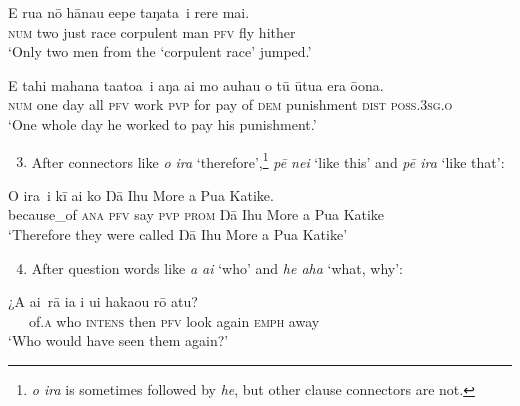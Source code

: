 \ea\label{ex:7.77}
\gll {\ob}E rua nō hānau {\ꞌ}e{\ꞌ}epe taŋata\,{\cb} i rere mai. \\
{\db}\textsc{num} two just race corpulent man \textsc{pfv} fly hither \\

\glt 
‘Only two men from the ‘corpulent race’ jumped.’ \textstyleExampleref{[Mtx-3-02.038]}
\z

\ea\label{ex:7.78}
\gll {\ob}E tahi mahana ta{\ꞌ}ato{\ꞌ}a\,{\cb} i aŋa ai mo {\ꞌ}auhau o tū ūtu{\ꞌ}a  era ō{\ꞌ}ona.\\
{\db}\textsc{num} one day all \textsc{pfv} work \textsc{pvp} for pay of \textsc{dem} punishment  \textsc{dist} \textsc{poss.3sg.o}\\

\glt
‘One whole day he worked to pay his punishment.’ \textstyleExampleref{[R250.026]} 
\z

\begin{enumerate}
\setcounter{enumi}{2} 
\item 
After  connectors like \textit{{\ꞌ}o ira} ‘therefore’,\footnote{\label{fn:339}\textit{{\ꞌ}o ira} is sometimes followed by \textit{he}, but other clause connectors are not.} \textit{pē nei} ‘like this’ and \textit{pē ira} ‘like that’: 

\end{enumerate}

\ea\label{ex:7.79}
\gll {\ob}{\ꞌ}O ira\,{\cb} i kī ai ko Ŋā Ihu More {\ꞌ}a Pua Katike.  \\
{\db}because\_of \textsc{ana} \textsc{pfv} say \textsc{pvp} \textsc{prom} Ŋā Ihu More {\ꞌ}a Pua Katike  \\

\glt
‘Therefore they were called Ŋā Ihu More {\ꞌ}a Pua Katike’ \textstyleExampleref{[R310.253]} 
\z

\begin{enumerate}
\setcounter{enumi}{3} 
\item 
After question words like \textit{{\ꞌ}a {\ꞌ}ai} ‘who’ and \textit{he aha} ‘what, why’: 

\end{enumerate}

\ea\label{ex:7.80}
\gll ¿{\ob}{\ꞌ}A {\ꞌ}ai\,{\cb} rā ia i u{\ꞌ}i haka{\ꞌ}ou rō atu? \\
~~~of\textsc{.a} who \textsc{intens} then \textsc{pfv} look again \textsc{emph} away \\

\glt 
‘Who would have seen them again?’ \textstyleExampleref{[R361.019]} 
\z

